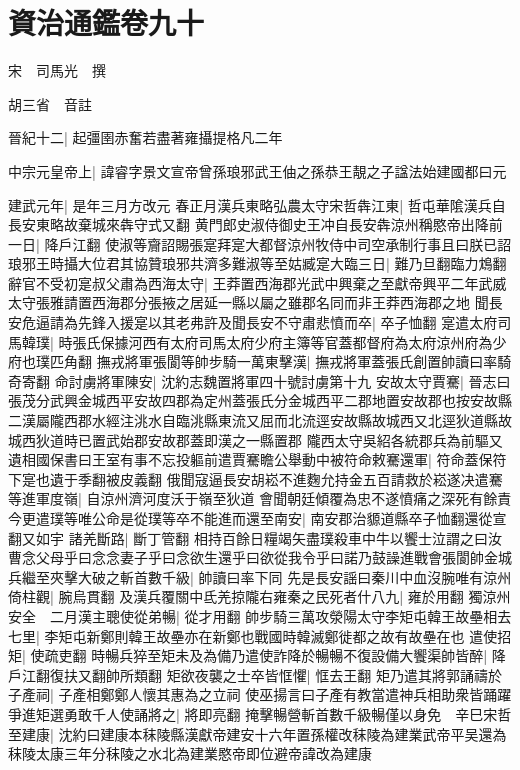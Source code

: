 \chapter{資治通鑑卷九十}
宋　司馬光　撰

胡三省　音註

晉紀十二|{
	起彊圉赤奮若盡著雍攝提格凡二年}


中宗元皇帝上|{
	諱睿字景文宣帝曾孫琅邪武王伷之孫恭王靚之子諡法始建國都曰元}


建武元年|{
	是年三月方改元}
春正月漢兵東略弘農太守宋哲犇江東|{
	哲屯華隂漢兵自長安東略故棄城來犇守式又翻}
黄門郎史淑侍御史王冲自長安犇涼州稱愍帝出降前一日|{
	降戶江翻}
使淑等齎詔賜張寔拜寔大都督涼州牧侍中司空承制行事且曰朕已詔琅邪王時攝大位君其協贊琅邪共濟多難淑等至姑臧寔大臨三日|{
	難乃旦翻臨力鴆翻}
辭官不受初寔叔父肅為西海太守|{
	王莽置西海郡光武中興棄之至獻帝興平二年武威太守張雅請置西海郡分張掖之居延一縣以屬之雖郡名同而非王莽西海郡之地}
聞長安危逼請為先鋒入援寔以其老弗許及聞長安不守肅悲憤而卒|{
	卒子恤翻}
寔遣太府司馬韓璞|{
	時張氏保據河西有太府司馬太府少府主簿等官蓋都督府為太府涼州府為少府也璞匹角翻}
撫戎將軍張閬等帥步騎一萬東擊漢|{
	撫戎將軍蓋張氏創置帥讀曰率騎奇寄翻}
命討虜將軍陳安|{
	沈約志魏置將軍四十號討虜第十九}
安故太守賈騫|{
	晉志曰張茂分武興金城西平安故四郡為定州蓋張氏分金城西平二郡地置安故郡也按安故縣二漢屬隴西郡水經注洮水自臨洮縣東流又屈而北流逕安故縣故城西又北逕狄道縣故城西狄道時已置武始郡安故郡蓋即漢之一縣置郡}
隴西太守吳紹各統郡兵為前驅又遺相國保書曰王室有事不忘投軀前遣賈騫瞻公舉動中被符命敕騫還軍|{
	符命蓋保符下寔也遺于季翻被皮義翻}
俄聞寇逼長安胡崧不進麴允持金五百請救於崧遂决遣騫等進軍度嶺|{
	自涼州濟河度沃于嶺至狄道}
會聞朝廷傾覆為忠不遂憤痛之深死有餘責今更遣璞等唯公命是從璞等卒不能進而還至南安|{
	南安郡治䝠道縣卒子恤翻還從宣翻又如宇}
諸羌斷路|{
	斷丁管翻}
相持百餘日糧竭矢盡璞殺車中牛以饗士泣謂之曰汝曹念父母乎曰念念妻子乎曰念欲生還乎曰欲從我令乎曰諾乃鼓譟進戰會張閬帥金城兵繼至夾擊大破之斬首數千級|{
	帥讀曰率下同}
先是長安謡曰秦川中血沒腕唯有涼州倚柱觀|{
	腕烏貫翻}
及漢兵覆關中氐羌掠隴右雍秦之民死者什八九|{
	雍於用翻}
獨涼州安全　二月漢主聰使從弟暢|{
	從才用翻}
帥步騎三萬攻滎陽太守李矩屯韓王故壘相去七里|{
	李矩屯新鄭則韓王故壘亦在新鄭也戰國時韓滅鄭徙都之故有故壘在也}
遣使招矩|{
	使疏吏翻}
時暢兵猝至矩未及為備乃遣使詐降於暢暢不復設備大饗渠帥皆醉|{
	降戶江翻復扶又翻帥所類翻}
矩欲夜襲之士卒皆恇懼|{
	恇去王翻}
矩乃遣其將郭誦禱於子產祠|{
	子產相鄭鄭人懷其惠為之立祠}
使巫揚言曰子產有教當遣神兵相助衆皆踊躍爭進矩選勇敢千人使誦將之|{
	將即亮翻}
掩擊暢營斬首數千級暢僅以身免　辛巳宋哲至建康|{
	沈約曰建康本秣陵縣漢獻帝建安十六年置孫權改秣陵為建業武帝平吴還為秣陵太康三年分秣陵之水北為建業愍帝即位避帝諱改為建康}
